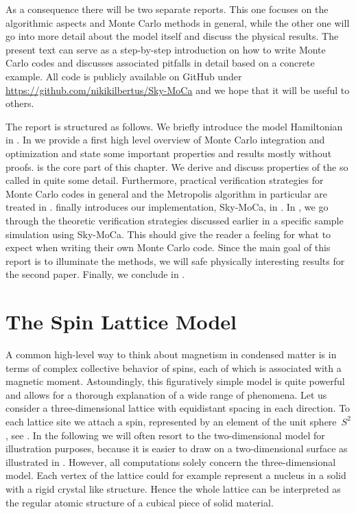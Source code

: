 As a consequence there will be two separate reports. This one focuses on the
algorithmic aspects and Monte Carlo methods in general, while the other one will
go into more detail about the model itself and discuss the physical results. The
present text can serve as a step-by-step introduction on how to write Monte
Carlo codes and discusses associated pitfalls in detail based on a concrete
example. All code is publicly available on GitHub under
\href{https://github.com/nikikilbertus/Sky-MoCa}{\textsf{https://github.com/nikikilbertus/Sky-MoCa}}
and we hope that it will be useful to others.

The report is structured as follows. We briefly introduce the model Hamiltonian
in . In  we provide a first high level
overview of Monte Carlo integration and optimization and state some important
properties and results mostly without proofs.  is the
core part of this chapter. We derive and discuss properties of the so called
 in quite some detail. Furthermore, practical
verification strategies for Monte Carlo codes in general and the Metropolis
algorithm in particular are treated in . 
finally introduces our implementation, Sky-MoCa, in . In
, we go through the theoretic verification strategies
discussed earlier in a specific sample simulation using Sky-MoCa. This should
give the reader a feeling for what to expect when writing their own Monte Carlo
code. Since the main goal of this report is to illuminate the methods, we will
safe physically interesting results for the second paper. Finally, we conclude
in .
%
\section{The Spin Lattice Model}\label{sec:model}
%
A common high-level way to think about magnetism in condensed matter is in terms
of complex collective behavior of spins, each of which is associated with a
magnetic moment. Astoundingly, this figuratively simple model is quite powerful
and allows for a thorough explanation of a wide range of phenomena. Let us
consider a three-dimensional lattice with equidistant spacing in each direction.
To each lattice site we attach a spin, represented by an element of the unit
sphere~$S^2$, see . In the following we will often resort to the
two-dimensional model for illustration purposes, because it is easier to draw on
a two-dimensional surface as illustrated in . However, all
computations solely concern the three-dimensional model. Each vertex of the
lattice could for example represent a nucleus in a solid with a rigid crystal
like structure. Hence the whole lattice can be interpreted as the regular atomic
structure of a cubical piece of solid material.

